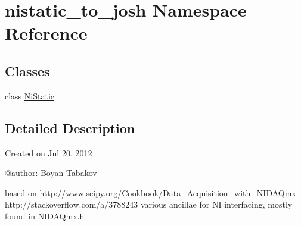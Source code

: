 \hypertarget{namespacenistatic__to__josh}{\section{nistatic\-\_\-to\-\_\-josh Namespace Reference}
\label{namespacenistatic__to__josh}
}
\subsection*{Classes}
\begin{DoxyCompactItemize}
\item 
class \hyperlink{classnistatic__to__josh_1_1_ni_static}{Ni\-Static}
\end{DoxyCompactItemize}


\subsection{Detailed Description}
\begin{DoxyVerb}Created on Jul 20, 2012

@author: Boyan Tabakov

based on    http://www.scipy.org/Cookbook/Data_Acquisition_with_NIDAQmx
        http://stackoverflow.com/a/3788243
various ancillae for NI interfacing, mostly found in NIDAQmx.h
\end{DoxyVerb}
 